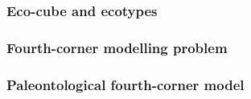 \documentclass{beamer}
\begin{document}
\begin{frame}
  \frametitle{Eco-cube and ecotypes}

  \begin{center}
  \end{center}

\end{frame}

\begin{frame}
  \frametitle{Fourth-corner modelling problem}
  \begin{center}
  \end{center}

\end{frame}

\begin{frame}
  \frametitle{Paleontological fourth-corner model}
  \begin{center}
  \end{center}

\end{frame}
\end{document}
